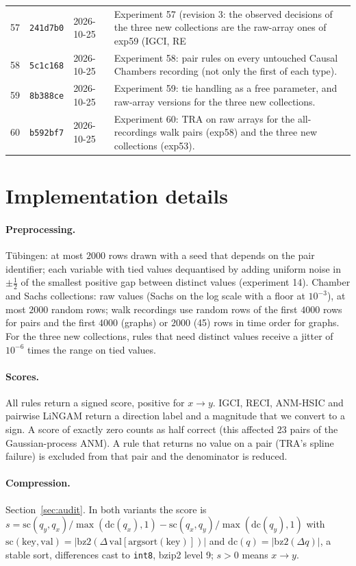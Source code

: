 \begin{longtable}{@{}rllp{9.8cm}@{}}
57 & \texttt{241d7b0} & 2026-10-25 & Experiment 57 (revision 3: the observed decisions of the three new collections are the raw-array ones of exp59 (IGCI, RE\\
58 & \texttt{5c1c168} & 2026-10-25 & Experiment 58: pair rules on every untouched Causal Chambers recording (not only the first of each type).\\
59 & \texttt{8b388ce} & 2026-10-25 & Experiment 59: tie handling as a free parameter, and raw-array versions for the three new collections.\\
60 & \texttt{b592bf7} & 2026-10-25 & Experiment 60: TRA on raw arrays for the all-recordings walk pairs (exp58) and the three new collections (exp53).\\
\bottomrule
\end{longtable}
\endgroup

\section{Implementation details}\label{app:impl}
\paragraph{Preprocessing.} T\"ubingen: at most $2000$ rows drawn with a seed that depends on the pair identifier; each variable with tied values dequantised by adding uniform noise in $\pm\frac12$ of the smallest positive gap between distinct values (experiment 14). Chamber and Sachs collections: raw values (Sachs on the log scale with a floor at $10^{-3}$), at most $2000$ random rows; walk recordings use random rows of the first $4000$ rows for pairs and the first $4000$ (graphs) or $2000$ (45) rows in time order for graphs. For the three new collections, rules that need distinct values receive a jitter of $10^{-6}$ times the range on tied values.
\paragraph{Scores.} All rules return a signed score, positive for $x\to y$. IGCI, RECI, ANM-HSIC and pairwise LiNGAM return a direction label and a magnitude that we convert to a sign. A score of exactly zero counts as half correct (this affected $23$ pairs of the Gaussian-process ANM). A rule that returns no value on a pair (TRA's spline failure) is excluded from that pair and the denominator is reduced.
\paragraph{Compression.} Section~\ref{sec:audit}. In both variants the score is $s=\mathrm{sc}(q_y,q_x)/\max(\mathrm{dc}(q_x),1)-\mathrm{sc}(q_x,q_y)/\max(\mathrm{dc}(q_y),1)$ with $\mathrm{sc}(\mathrm{key},\mathrm{val})=|\mathrm{bz2}(\Delta\,\mathrm{val}[\mathrm{argsort}(\mathrm{key})])|$ and $\mathrm{dc}(q)=|\mathrm{bz2}(\Delta q)|$, a stable sort, differences cast to \texttt{int8}, bzip2 level 9; $s>0$ means $x\to y$.
